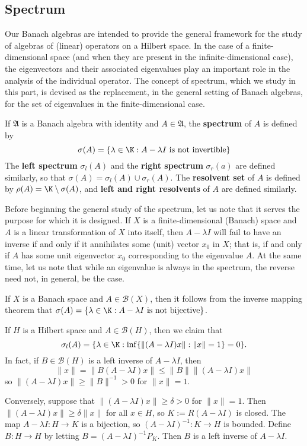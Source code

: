 \subsection{Spectrum}
Our Banach algebras are intended to provide the general framework for the study of algebras of (linear) operators on a Hilbert space. In the case of a finite-dimensional space (and when they are present in the infinite-dimensional case), the eigenvectors and their associated eigenvalues play an important role in the analysis of the individual operator. The concept of spectrum, which we study in this part, is devised as the replacement, in the general setting of Banach algebras, for the set of eigenvalues in the finite-dimensional case.
\begin{definition}
If $\mathfrak{A}$ is a Banach algebra with identity and $A\in\mathfrak{A}$, the \textbf{spectrum} of $A$ is defined by
\[\sigma(A)=\{\lambda\in\K:\text{$A-\lambda I$ is not invertible}\}\]
The \textbf{left spectrum} $\sigma_l(A)$ and the \textbf{right spectrum} $\sigma_r(a)$ are defined similarly, so that $\sigma(A)=\sigma_l(A)\cup\sigma_r(A)$. The \textbf{resolvent set} of $A$ is defined by $\rho(A)=\K\setminus\sigma(A)$, and \textbf{left and right resolvents} of $A$ are defined similarly.
\end{definition}
Before beginning the general study of the spectrum, let us note that it serves the purpose for which it is designed. If $X$ is a finite-dimensional (Banach) space and $A$ is a linear transformation of $X$ into itself, then $A-\lambda I$ will fail to have an inverse if and only if it annihilates some (unit) vector $x_0$ in $X$; that is, if and only if $A$ has some unit eigenvector $x_0$ corresponding to the eigenvalue $A$. At the same time, let us note that while an eigenvalue is always in the spectrum, the reverse need not, in general, be the case.
\begin{example}\label{Banach space operator spectrum char}
If $X$ is a Banach space and $A\in\mathcal{B}(X)$, then it follows from the inverse mapping theorem that $\sigma(A)=\{\lambda\in\K:\text{$A-\lambda I$ is not bijective}\}$.
\end{example}
\begin{example}\label{Hilbert space operator left-spectrum char}
If $H$ is a Hilbert space and $A\in\mathcal{B}(H)$, then we claim that
\[\sigma_l(A)=\{\lambda\in\K:\inf\{\|(A-\lambda I)x\|:\|x\|=1\}=0\}.\]
In fact, if $B\in\mathcal{B}(H)$ is a left inverse of $A-\lambda I$, then
\[\|x\|=\|B(A-\lambda I)x\|\leq\|B\|\|(A-\lambda I)x\|\]
so $\|(A-\lambda I)x\|\geq\|B\|^{-1}>0$ for $\|x\|=1$.\par
Conversely, suppose that $\|(A-\lambda I)x\|\geq\delta>0$ for $\|x\|=1$. Then $\|(A-\lambda I)x\|\geq\delta\|x\|$ for all $x\in H$, so $K:=R(A-\lambda I)$ is closed. The map $A-\lambda I:H\to K$ is a bijection, so $(A-\lambda I)^{-1}:K\to H$ is bounded. Define $B:H\to H$ by letting $B=(A-\lambda I)^{-1}P_K$. Then $B$ is a left inverse of $A-\lambda I$.
\end{example}

